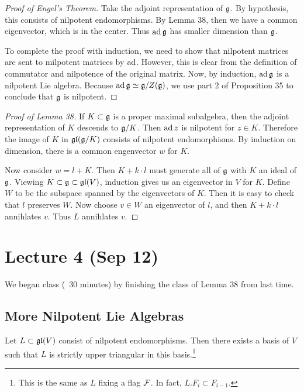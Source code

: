\documentclass[twoside, 10pt]{article}
\begin{document}
    \begin{proof}[Proof of Engel's Theorem]
        Take the adjoint representation of $\mathfrak{g}$. By hypothesis, this consists of nilpotent endomorphisms. By Lemma 38, then we have a common eigenvector, which is in the center. Thus $\operatorname{ad} \mathfrak{g}$ has smaller dimension than $\mathfrak{g}$.
        
        To complete the proof with induction, we need to show that nilpotent matrices are sent to milpotent matrices by $\operatorname{ad}$. However, this is clear from the definition of commutator and nilpotence of the original matrix. Now, by induction, $\operatorname{ad} \mathfrak{g}$ is a nilpotent Lie algebra. Because $\operatorname{ad} \mathfrak{g} \simeq \mathfrak{g} / Z(\mathfrak{g})$, we use part $2$ of Proposition 35 to conclude that $\mathfrak{g}$ is nilpotent.
    \end{proof}

    \begin{proof}[Proof of Lemma 38]
        If $K \subset \mathfrak{g}$ is a proper maximal subalgebra, then the adjoint representation of $K$ descends to $\mathfrak{g}/K$. Then $\operatorname{ad} z$ is nilpotent for $z \in K$. Therefore the image of $K$ in $\mathfrak{gl}(\mathfrak{g}/K)$ consists of nilpotent endomorphisms. By induction on dimension, there is a common engenvector $w$ for $K$.

        Now consider $w = l+K$. Then $K + k \cdot l$ must generate all of $\mathfrak{g}$ with $K$ an ideal of $\mathfrak{g}$. Viewing $K \subset \mathfrak{g} \subset \mathfrak{gl}(V)$, induction gives us an eigenvector in $V$ for $K$. Define $W$ to be the subspace spanned by the eigenvectors of $K$. Then it is easy to check that $l$ preserves $W$. Now choose $v \in W$ an eigenvector of $l$, and then $K + k \cdot l$ annihlates $v$. Thus $L$ annihlates $v$.
    \end{proof}

    \section{Lecture 4 (Sep 12)}%
    \label{sec:lecture_4_sep_12_}

    We began class (~30 minutes) by finishing the class of Lemma 38 from last time.

    \subsection{More Nilpotent Lie Algebras}%
    \label{sub:more_nilpotent_lie_algebras}
    
    
    \begin{cor}
        Let $L \subset \mathfrak{gl}(V)$ consist of nilpotent endomorphisms. Then there exists a basis of $V$ such that $L$ is strictly upper triangular in this basis.\footnote{This is the same as $L$ fixing a flag $\mathcal{F}$. In fact, $L.F_i \subset F_{i-1}$.}
    \end{cor}
\end{document}
